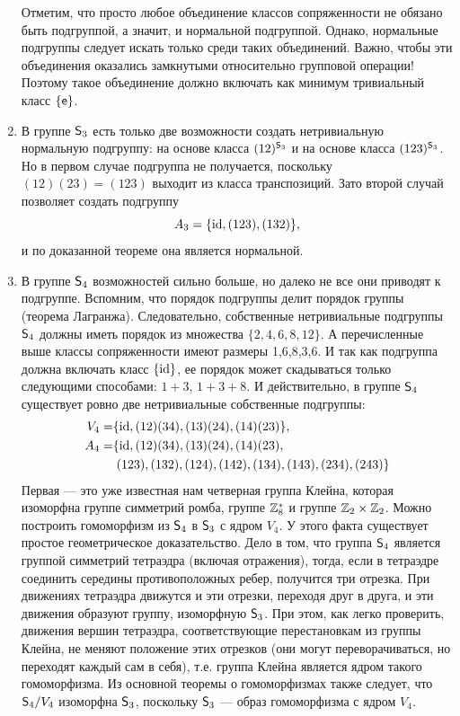 \begin{enumerate}
Отметим, что просто любое объединение классов сопряженности не обязано быть подгруппой, а значит, и нормальной подгруппой. Однако, нормальные подгруппы следует искать только среди таких объединений. Важно, чтобы эти объединения оказались замкнутыми относительно групповой операции! Поэтому такое объединение должно включать как минимум тривиальный класс $\{\mathsf e\}$.

\item В группе ${\mathsf{S}}_3$ есть только две возможности создать нетривиальную нормальную подгруппу: на основе класса $(12)^{{\mathsf{S}}_3}$ и на основе класса $(123)^{{\mathsf{S}}_3}$. Но в первом случае подгруппа не получается, поскольку $(12)(23)=(123)$ выходит из класса транспозиций. Зато второй случай позволяет создать подгруппу
$$
A_3 = \{\mathrm{id},(123),(132)\},
$$
и по доказанной теореме она является нормальной.

\item В группе ${\mathsf{S}}_4$ возможностей сильно больше, но далеко не все они приводят к подгруппе. Вспомним, что порядок подгруппы делит порядок группы (теорема Лагранжа). Следовательно, собственные нетривиальные подгруппы ${\mathsf{S}}_4$ должны иметь порядок из множества $\{2,4,6,8,12\}$. А перечисленные выше классы сопряженности имеют размеры 1,6,8,3,6. И так как подгруппа должна включать класс $\{\mathrm{id}\}$, ее порядок может скадываться только следующими способами: $1+3$, $1+3+8$. И действительно, в группе ${\mathsf{S}}_4$ существует ровно две нетривиальные собственные подгруппы:
\begin{align*}
V_4 = & \{\mathrm{id},(12)(34),(13)(24),(14)(23)\},\\
A_4 = & \{\mathrm{id},(12)(34),(13)(24),(14)(23), \\
      & \;(123),(132),(124),(142),(134),(143),(234),(243)\}
\end{align*}
Первая --- это уже известная нам четверная группа Клейна, которая изоморфна группе симметрий ромба, группе $\mathbb Z_8^*$ и группе $\mathbb Z_2\times\mathbb Z_2$. Можно построить гомоморфизм из ${\mathsf{S}}_4$ в ${\mathsf{S}}_3$ с ядром $V_4$. У этого факта существует простое геометрическое доказательство. Дело в том, что группа ${\mathsf{S}}_4$ является группой симметрий тетраэдра (включая отражения), тогда, если в тетраэдре соединить середины противоположных ребер, получится три отрезка. При движениях тетраэдра движутся и эти отрезки, переходя друг в друга, и эти движения образуют группу, изоморфную ${\mathsf{S}}_3$. При этом, как легко проверить, движения вершин тетраэдра, соответствующие перестановкам из группы Клейна, не меняют положение этих отрезков (они могут переворачиваться, но переходят каждый сам в себя), т.е. группа Клейна является ядром такого гомоморфизма. Из основной теоремы о гомоморфизмах также следует, что ${\mathsf{S}}_4/V_4$ изоморфна ${\mathsf{S}}_3$, поскольку ${\mathsf{S}}_3$ --- образ гомоморфизма с ядром $V_4$.


\end{enumerate}
